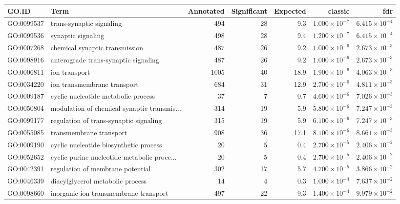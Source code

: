 \begin{table}[ht]
\centering
\begin{tabular}{llrrrrr}
  \hline
GO.ID & Term & Annotated & Significant & Expected & classic & fdr \\ 
  \hline
GO:0099537 & trans-synaptic signaling & 494 & 28 & 9.3 & $1.000 \times 10^{-7}$ & $6.415 \times 10^{-4}$ \\ 
  GO:0099536 & synaptic signaling & 498 & 28 & 9.4 & $1.200 \times 10^{-7}$ & $6.415 \times 10^{-4}$ \\ 
  GO:0007268 & chemical synaptic transmission & 487 & 26 & 9.2 & $1.000 \times 10^{-6}$ & $2.673 \times 10^{-3}$ \\ 
  GO:0098916 & anterograde trans-synaptic signaling & 487 & 26 & 9.2 & $1.000 \times 10^{-6}$ & $2.673 \times 10^{-3}$ \\ 
  GO:0006811 & ion transport & 1005 & 40 & 18.9 & $1.900 \times 10^{-6}$ & $4.063 \times 10^{-3}$ \\ 
  GO:0034220 & ion transmembrane transport & 684 & 31 & 12.9 & $2.700 \times 10^{-6}$ & $4.811 \times 10^{-3}$ \\ 
  GO:0009187 & cyclic nucleotide metabolic process & 37 & 7 & 0.7 & $4.600 \times 10^{-6}$ & $7.026 \times 10^{-3}$ \\ 
  GO:0050804 & modulation of chemical synaptic transmis... & 314 & 19 & 5.9 & $5.800 \times 10^{-6}$ & $7.247 \times 10^{-3}$ \\ 
  GO:0099177 & regulation of trans-synaptic signaling & 315 & 19 & 5.9 & $6.100 \times 10^{-6}$ & $7.247 \times 10^{-3}$ \\ 
  GO:0055085 & transmembrane transport & 908 & 36 & 17.1 & $8.100 \times 10^{-6}$ & $8.661 \times 10^{-3}$ \\ 
  GO:0009190 & cyclic nucleotide biosynthetic process & 20 & 5 & 0.4 & $2.700 \times 10^{-5}$ & $2.406 \times 10^{-2}$ \\ 
  GO:0052652 & cyclic purine nucleotide metabolic proce... & 20 & 5 & 0.4 & $2.700 \times 10^{-5}$ & $2.406 \times 10^{-2}$ \\ 
  GO:0042391 & regulation of membrane potential & 302 & 17 & 5.7 & $4.700 \times 10^{-5}$ & $3.866 \times 10^{-2}$ \\ 
  GO:0046339 & diacylglycerol metabolic process & 14 & 4 & 0.3 & $1.000 \times 10^{-4}$ & $7.637 \times 10^{-2}$ \\ 
  GO:0098660 & inorganic ion transmembrane transport & 497 & 22 & 9.3 & $1.400 \times 10^{-4}$ & $9.979 \times 10^{-2}$ \\ 

\end{tabular}
\end{table}
